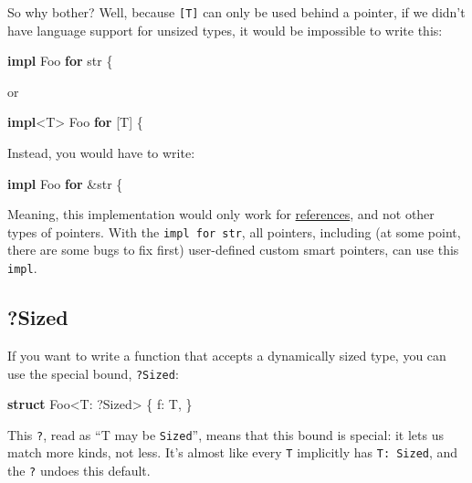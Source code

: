 \documentclass[a4paper,]{book}
\newenvironment{Shaded}{\begin{snugshade}}{\end{snugshade}}
\newcommand{\KeywordTok}[1]{\textcolor[rgb]{0.13,0.29,0.53}{\textbf{{#1}}}}
\newcommand{\DataTypeTok}[1]{\textcolor[rgb]{0.13,0.29,0.53}{{#1}}}
\newcommand{\BuiltInTok}[1]{{#1}}
\newcommand{\NormalTok}[1]{{#1}}
\begin{document}
So why bother? Well, because \texttt{{[}T{]}} can only be used behind a
pointer, if we didn't have language support for unsized types, it would
be impossible to write this:

\begin{Shaded}
\begin{Highlighting}[]
\KeywordTok{impl} \NormalTok{Foo }\KeywordTok{for} \DataTypeTok{str} \NormalTok{\{}
\end{Highlighting}
\end{Shaded}

or

\begin{Shaded}
\begin{Highlighting}[]
\KeywordTok{impl}\NormalTok{<T> Foo }\KeywordTok{for} \NormalTok{[T] \{}
\end{Highlighting}
\end{Shaded}

Instead, you would have to write:

\begin{Shaded}
\begin{Highlighting}[]
\KeywordTok{impl} \NormalTok{Foo }\KeywordTok{for} \NormalTok{&}\DataTypeTok{str} \NormalTok{\{}
\end{Highlighting}
\end{Shaded}

Meaning, this implementation would only work for
\protect\hyperlink{sec--references-and-borrowing}{references}, and not
other types of pointers. With the \texttt{impl\ for\ str}, all pointers,
including (at some point, there are some bugs to fix first) user-defined
custom smart pointers, can use this \texttt{impl}.

\subsection{?Sized}\label{sized}

If you want to write a function that accepts a dynamically sized type,
you can use the special bound, \texttt{?Sized}:

\begin{Shaded}
\begin{Highlighting}[]
\KeywordTok{struct} \NormalTok{Foo<T: ?}\BuiltInTok{Sized}\NormalTok{> \{}
    \NormalTok{f: T,}
\NormalTok{\}}
\end{Highlighting}
\end{Shaded}

This \texttt{?}, read as ``T may be \texttt{Sized}'', means that this
bound is special: it lets us match more kinds, not less. It's almost
like every \texttt{T} implicitly has \texttt{T:\ Sized}, and the
\texttt{?} undoes this default.
\end{document}
